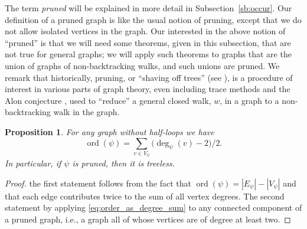 \documentclass{memo-l}
\theoremstyle{plain}
\newtheorem{proposition}[theorem]{Proposition}
\theoremstyle{definition}
\numberwithin{section}{chapter}
\numberwithin{equation}{chapter}
\DeclareMathOperator{\ord}{ord}
\DeclareMathOperator{\Graph}{Graph}
\theoremstyle{plain}
\theoremstyle{definition}
\begin{document}
The term {\em pruned} will be explained in more detail in
Subsection~\ref{sb:occur}.  
Our definition of a pruned graph is like the usual
notion of pruning, except that we do not allow isolated vertices in
the graph.
Our interested in the above notion of ``pruned'' is that we 
will need some theorems, given in this subsection, that are not
true for general graphs; we will apply such theorems to graphs that are
the union of graphs of non-backtracking walks, and such unions are 
pruned.
We remark that historically, pruning, or ``shaving off
trees'' (see \cite{stallings83}), is a procedure of interest in
various parts of graph theory, even including 
trace methods and the Alon conjecture
\cite{broder,friedman_random_graphs}, used to
``reduce'' a general closed walk, $w$,
in a graph
to a non-backtracking walk in the graph.

\begin{proposition}
\label{pr:order_under_inclusion}
For any graph without half-loops we have
\begin{equation}\label{eq:order_as_degree_sum}
\ord(\psi) = \sum_{v\in V_\psi} \bigl( \deg_\psi(v) - 2 \bigr)/2.
\end{equation}
In particular, if $\psi$ is pruned, then it is treeless.
\end{proposition}
\begin{proof} 
the first statement follows from the fact that
$\ord(\psi)=|E_\psi|-|V_\psi|$ and that each edge contributes twice
to the sum of all vertex degrees.
The second statement by applying 
\eqref{eq:order_as_degree_sum} to any connected component of a pruned
graph, i.e., a graph all of whose vertices are of degree at least
two.
\end{proof}
\end{document}
